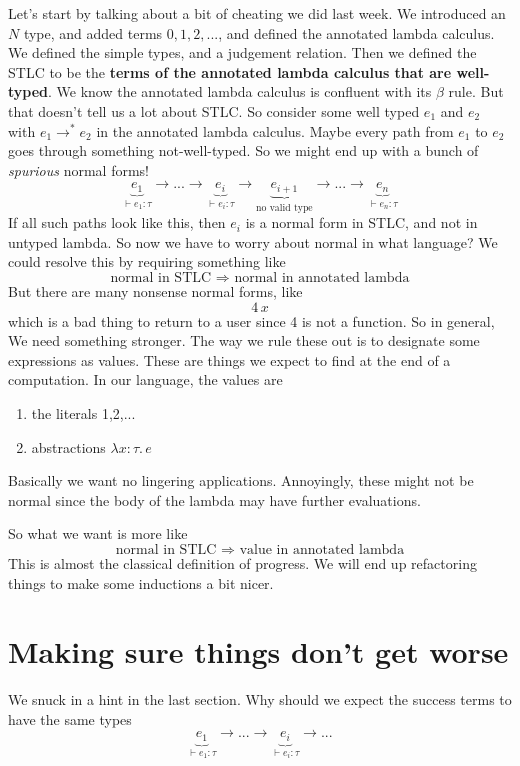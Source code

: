 \documentclass[12pt]{article}
\begin{document}
Let's start by talking about a bit of cheating we did last week.
We introduced an $N$ type, and added terms $0,1,2,...$, and defined the annotated lambda calculus.
We defined the simple types, and a judgement relation.
Then we defined the STLC to be the \textbf{terms of the annotated lambda calculus that are well-typed}.
We know the annotated lambda calculus is confluent with its $\beta$ rule.
But that doesn't tell us a lot about STLC.
So consider some well typed $e_1$ and $e_2$ with $e_1 \rightarrow^* e_2$ in the annotated lambda calculus.
Maybe every path from $e_1$ to $e_2$ goes through something not-well-typed.
So we might end up with a bunch of \textit{spurious} normal forms!
\[
  \underbrace{e_1}_{\vdash e_1 : \tau} \rightarrow ... \rightarrow \underbrace{e_i}_{\vdash e_i : \tau} \rightarrow \underbrace{e_{i+1}}_{\text{no valid type}} \rightarrow ... \rightarrow \underbrace{e_n}_{\vdash e_n : \tau}
\]
If all such paths look like this, then $e_i$ is a normal form in STLC, and not in untyped lambda.
So now we have to worry about normal in what language?
We could resolve this by requiring something like 
\[
  \text{ normal in STLC } \Rightarrow \text{ normal in annotated lambda }
\]
But there are many nonsense normal forms, like 
\[
  4\, x
\]
which is a bad thing to return to a user since 4 is not a function.
So in general, We need something stronger. 
The way we rule these out is to designate some expressions as values.
These are things we expect to find at the end of a computation.
In our language, the values are
\begin{enumerate}
    \item the literals 1,2,...
    \item abstractions $\lambda x:\tau.\, e$
\end{enumerate}
Basically we want no lingering applications.
Annoyingly, these might not be normal since the body of the lambda may have further evaluations.

So what we want is more like
\[
  \text{ normal in STLC } \Rightarrow \text{ value in annotated lambda }
\]
This is almost the classical definition of progress.
We will end up refactoring things to make some inductions a bit nicer.

\section{Making sure things don't get worse}
We snuck in a hint in the last section.
Why should we expect the success terms to have the same types
\[
  \underbrace{e_1}_{\vdash e_1 : \tau} \rightarrow ... \rightarrow \underbrace{e_i}_{\vdash e_i : \tau} \rightarrow ...
\]
\end{document}
